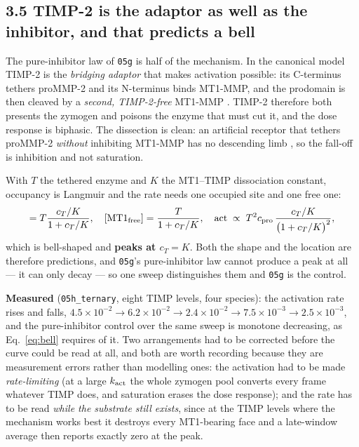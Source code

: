 \documentclass[10pt,a4paper]{article}
\newcommand{\op}[1]{\texttt{#1}}
\begin{document}
\subsection*{3.5\; TIMP-2 is the adaptor as well as the inhibitor, and that predicts a bell}

The pure-inhibitor law of \op{05g} is half of the mechanism. In the canonical model
\cite{karagiannis2004} TIMP-2 is the \emph{bridging adaptor} that makes activation possible: its
C-terminus tethers proMMP-2 and its N-terminus binds MT1-MMP, and the prodomain is then cleaved by a
\emph{second, TIMP-2-free} MT1-MMP \cite{sato2010}. TIMP-2 therefore both presents the zymogen and
poisons the enzyme that must cut it, and the dose response is biphasic. The dissection is clean: an
artificial receptor that tethers proMMP-2 \emph{without} inhibiting MT1-MMP has no descending limb
\cite{cancerres2008}, so the fall-off is inhibition and not saturation.

With $T$ the tethered enzyme and $K$ the MT1--TIMP dissociation constant, occupancy is Langmuir and the
rate needs one occupied site and one free one:
%
\begin{equation}
[\mathrm{MT1\!\cdot\!TIMP}]=T\frac{c_T/K}{1+c_T/K},\quad
[\mathrm{MT1_{free}}]=\frac{T}{1+c_T/K},\quad
\text{act}\;\propto\;T^2c_{\rm pro}\,\frac{c_T/K}{\bigl(1+c_T/K\bigr)^2},
\label{eq:bell}
\end{equation}
%
which is bell-shaped and \textbf{peaks at $c_T=K$}. Both the shape and the location are therefore
predictions, and \op{05g}'s pure-inhibitor law cannot produce a peak at all --- it can only decay ---
so one sweep distinguishes them and \op{05g} is the control.

\textbf{Measured} (\op{05h\_ternary}, eight TIMP levels, four species): the activation rate rises and
falls, $4.5\times10^{-2}\to6.2\times10^{-2}\to2.4\times10^{-2}\to7.5\times10^{-3}\to2.5\times10^{-3}$,
and the pure-inhibitor control over the same sweep is monotone decreasing, as Eq.~\eqref{eq:bell}
requires of it. Two arrangements had to be corrected before the curve could be read at all, and both
are worth recording because they are measurement errors rather than modelling ones: the activation had
to be made \emph{rate-limiting} (at a large $k_{\rm act}$ the whole zymogen pool converts every frame
whatever TIMP does, and saturation erases the dose response); and the rate has to be read \emph{while
the substrate still exists}, since at the TIMP levels where the mechanism works best it destroys every
MT1-bearing face and a late-window average then reports exactly zero at the peak.
\end{document}
